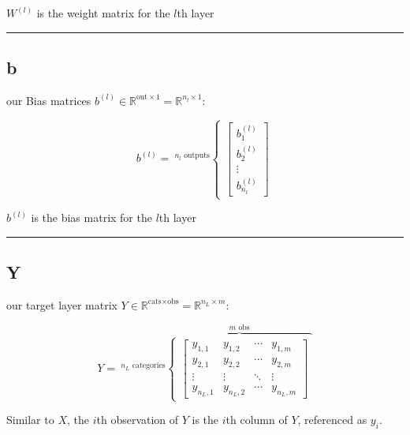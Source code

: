 \documentclass[
]{book}
\begin{document}
\(W^{(l)}\) is the weight matrix for the \(l\)th layer

\begin{center}\rule{0.5\linewidth}{0.5pt}\end{center}

\hypertarget{b-1}{%
\subsection{b}\label{b-1}}

our Bias matrices \(b^{(l)} \in \mathbb{R}^{\text{out} \times 1} = \mathbb{R}^{n_l \times 1}\):

\[
b^{(l)} = \ ^{n_l\text{ outputs}}
  \begin{cases}
    \begin{bmatrix}
    b^{(l)}_{1} \\
    b^{(l)}_{2} \\
    \vdots \\
    b^{(l)}_{n_l}
    \end{bmatrix}
  \end{cases}
\]

\(b^{(l)}\) is the bias matrix for the \(l\)th layer

\begin{center}\rule{0.5\linewidth}{0.5pt}\end{center}

\hypertarget{y}{%
\subsection{Y}\label{y}}

our target layer matrix \(Y \in \mathbb{R}^{\text{cats} \times \text{obs}} = \mathbb{R}^{n_L \times m}\):

\[
Y = \ ^{n_L \text{ categories}}
\overbrace{
  \begin{cases}
    \begin{bmatrix}
    y_{1, 1} & y_{1, 2} & \cdots & y_{1, m} \\
    y_{2, 1} & y_{2, 2} & \cdots & y_{2, m} \\
    \vdots & \vdots & \ddots & \vdots \\
    y_{n_L, 1} & y_{n_L, 2} & \cdots & y_{n_L, m}
    \end{bmatrix}
  \end{cases} 
}^{m \text{ obs}}
\]

Similar to \(X\), the \(i\)th observation of \(Y\) is the \(i\)th column of \(Y\), referenced as \(y_i\).
\end{document}
